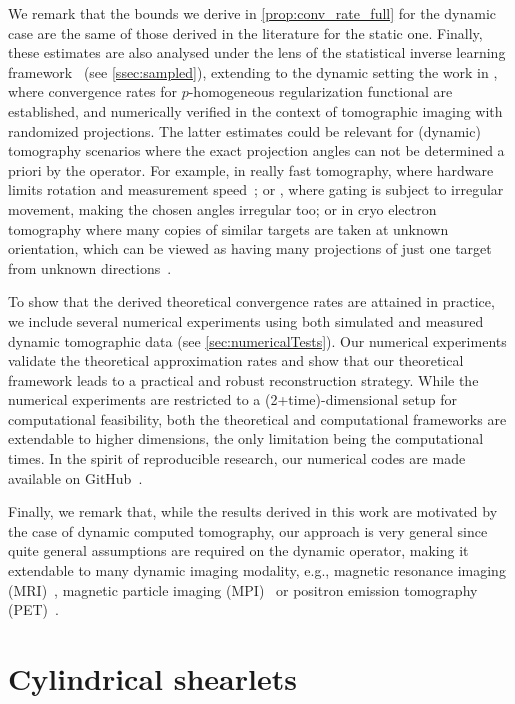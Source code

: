 \documentclass[11pt,a4paper]{article}
\numberwithin{equation}{section}
\begin{document}
We remark that the bounds we derive in \cref{prop:conv_rate_full} for the dynamic case are the same of those derived in the literature for the static one.
Finally, these estimates are also analysed under the lens of the statistical inverse learning framework~\cite{blanchard2018optimal} (see \cref{ssec:sampled}), extending to the dynamic setting the work in \cite{bubba2021, Bubba22}, where convergence rates for $p$-homogeneous regularization functional are established, and numerically verified in the context of tomographic imaging with randomized projections. The latter estimates could be relevant for (dynamic) tomography scenarios where the exact projection angles can not be determined a priori by the operator. For example, in really fast tomography, where hardware limits rotation and measurement speed~\cite{ruhlandt2017four}; or \cite{walker2014vivo}, where gating is subject to irregular movement, making the chosen angles irregular too; or in cryo electron tomography where many copies of similar targets are taken at unknown orientation, which can be viewed as having many projections of just one target from unknown directions~\cite{oikonomou2016new}.

To show that the derived theoretical convergence rates are attained in practice, we include several numerical experiments using both simulated and measured dynamic tomographic data (see \cref{sec:numericalTests}). Our  numerical experiments validate the theoretical approximation rates  and show that our theoretical framework leads to a practical and robust reconstruction strategy. While the numerical experiments are restricted to a (2+time)-dimensional setup for computational feasibility, both the theoretical and computational frameworks are extendable to higher dimensions, the only limitation being the computational times. In the spirit of reproducible research, our numerical codes are made available on GitHub~\cite{randDynTomo}.

Finally, we remark that, while the results derived in this work are motivated by the case of dynamic computed tomography, our approach is very general since quite general assumptions are required on the dynamic operator, making it extendable to many dynamic imaging  modality, e.g., magnetic resonance imaging (MRI)~\cite{otazo2015low}, magnetic particle imaging (MPI)~\cite{brandt2024dynamic} or positron emission tomography (PET)~\cite{schmitzer2020dynamic}.




\section{Cylindrical shearlets} \label{sec:cylShearlets}
\end{document}
